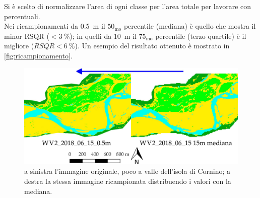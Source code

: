 %
Si è scelto di normalizzare l'area di ogni classe per l'area totale per lavorare con percentuali.
\\
Nei ricampionamenti da \SI{0.5}{\m} il $50_\mathrm{mo}$ percentile (mediana) è quello che mostra il minor RSQR ($<\SI{3}{\percent}$); in quelli da \SI{10}{\m} il $75_\mathrm{mo}$ percentile (terzo quartile) è il migliore ($RSQR<\SI{6}{\percent}$). Un esempio del risultato ottenuto è mostrato in \vref{fig:ricampionamento}.
%
\begin{figure}
	\centering
	\includegraphics[width=\textwidth]{files/ricamp_class_is_fl.jpeg}
	\caption[confronto originale - ricampionamento]{a sinistra l'immagine \WV{} originale, poco a valle dell'isola di Cornino; a destra la stessa immagine ricampionata distribuendo i valori con la mediana.}
	\label{fig:ricampionamento}
\end{figure} 
%


